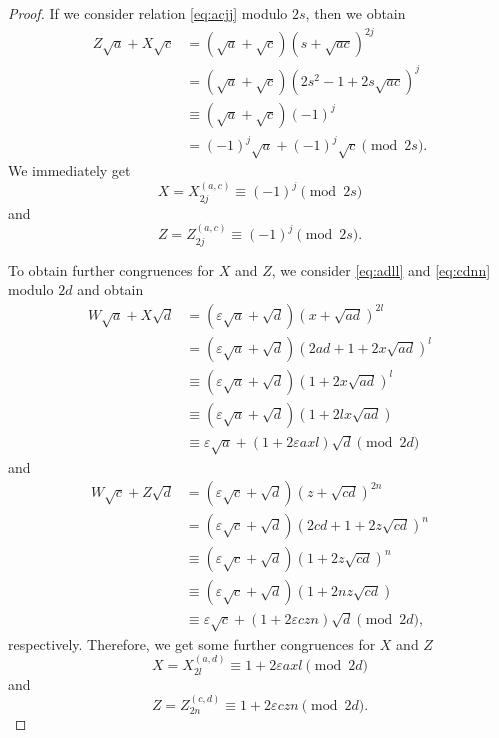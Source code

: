\documentclass{amsart}
\theoremstyle{definition}
\begin{document}
\begin{proof}
If we consider relation \eqref{eq:acjj} modulo $2s$, then we obtain 
\begin{equation}\label{eq:acs}
\begin{split}
Z\sqrt{a} + X\sqrt{c}&=(\sqrt{a}+\sqrt{c})(s+\sqrt{ac})^{2j}\\ 
&=(\sqrt{a}+\sqrt{c})(2s^2-1+2s\sqrt{ac})^{j}\\ 
&\equiv (\sqrt{a}+\sqrt{c})(-1)^j\\ 
&= (-1)^j \sqrt{a} + (-1)^j\sqrt{c} \pmod{2s}.
\end{split}
\end{equation}
We immediately get
\begin{equation}\label{eq:alpha1}
X = X^{(a,c)}_{2j} \equiv (-1)^j \pmod{2s}
\end{equation}
and 
\begin{equation}\label{eq:gamma1}
Z= Z^{(a,c)}_{2j} \equiv (-1)^j \pmod{2s}. 
\end{equation}

To obtain further congruences for $X$ and $Z$, we consider \eqref{eq:adll} and \eqref{eq:cdnn} modulo $2d$ and obtain 
\begin{equation}\label{eq:add}
\begin{split}
W \sqrt{a} + X \sqrt{d} &= (\varepsilon \sqrt{a} + \sqrt{d})(x+\sqrt{ad})^{2l}\\ 
&=(\varepsilon\sqrt{a}+\sqrt{d})(2ad+1+2x\sqrt{ad})^{l}\\ 
&\equiv (\varepsilon\sqrt{a}+\sqrt{d})(1+2x\sqrt{ad})^l\\ 
&\equiv (\varepsilon\sqrt{a}+\sqrt{d})(1+2lx\sqrt{ad}) \\ 
&\equiv \varepsilon\sqrt{a}+(1+2\varepsilon a  x l)\sqrt{d} \pmod{2d}
\end{split}
\end{equation}
and
\begin{equation}\label{eq:cdd}
\begin{split}
W\sqrt{c} +Z\sqrt{d}&=(\varepsilon\sqrt{c}+\sqrt{d})(z+\sqrt{cd})^{2n}\\ 
&= (\varepsilon\sqrt{c}+\sqrt{d})(2cd+1+2z\sqrt{cd})^{n}\\ 
&\equiv (\varepsilon\sqrt{c}+\sqrt{d})(1+2z\sqrt{cd})^n\\ 
&\equiv (\varepsilon\sqrt{c}+\sqrt{d})(1+2nz\sqrt{cd}) \\ 
&\equiv \varepsilon\sqrt{c}+(1+2\varepsilon cz n)\sqrt{d} \pmod{2d},
\end{split}
\end{equation}
respectively. Therefore, we get some further congruences for $X$ and $Z$
\begin{equation}\label{eq:alpha2}
 X= X^{(a,d)}_{2l} \equiv 1+2\varepsilon a  x l \pmod{2d}
\end{equation}
and
\begin{equation}\label{eq:gamma2}
 Z= Z^{(c,d)}_{2n} \equiv 1+2\varepsilon czn \pmod{2d}.
\end{equation}


\end{proof}
\end{document}
